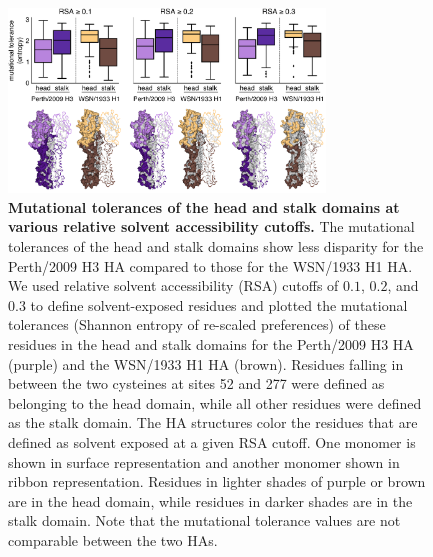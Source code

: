 \documentclass[9pt,twoside,lineno]{pnas-new}
\begin{document}
\begin{figure}
\centerline{\includegraphics[width=0.75\textwidth]{figs/supp_head_stalk_RSA/head_stalk_RSA.pdf}}
\caption{\label{suppfig:head_stalk_RSA}
{\bf Mutational tolerances of the head and stalk domains at various relative solvent accessibility cutoffs.}
The mutational tolerances of the head and stalk domains show less disparity for the Perth/2009 H3 HA compared to those for the WSN/1933 H1 HA.
We used relative solvent accessibility (RSA) cutoffs of $0.1$, $0.2$, and $0.3$ to define solvent-exposed residues and plotted the mutational tolerances (Shannon entropy of re-scaled preferences) of these residues in the head and stalk domains for the Perth/2009 H3 HA (purple) and the WSN/1933 H1 HA (brown).
Residues falling in between the two cysteines at sites 52 and 277 were defined as belonging to the head domain, while all other residues were defined as the stalk domain.
The HA structures color the residues that are defined as solvent exposed at a given RSA cutoff.
One monomer is shown in surface representation and another monomer shown in ribbon representation.
Residues in lighter shades of purple or brown are in the head domain, while residues in darker shades are in the stalk domain.
Note that the mutational tolerance values are not comparable between the two HAs.
}
\end{figure}
\FloatBarrier
\end{document}

